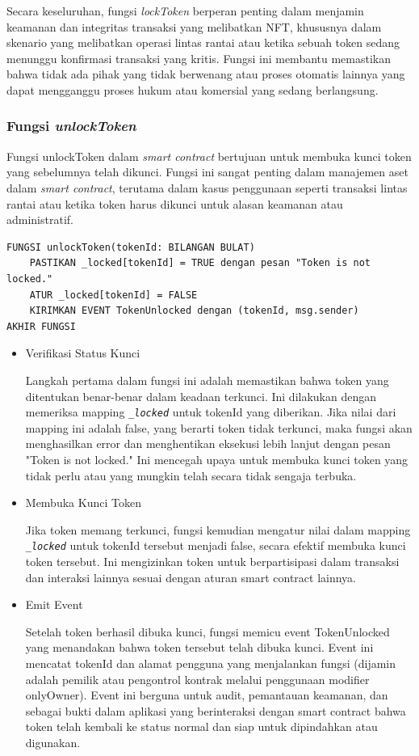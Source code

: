 Secara keseluruhan, fungsi \emph{lockToken} berperan penting dalam menjamin keamanan dan integritas transaksi yang melibatkan NFT, khususnya dalam skenario yang melibatkan operasi lintas rantai atau ketika sebuah token sedang menunggu konfirmasi transaksi yang kritis. Fungsi ini membantu memastikan bahwa tidak ada pihak yang tidak berwenang atau proses otomatis lainnya yang dapat mengganggu proses hukum atau komersial yang sedang berlangsung.

\subsubsection{Fungsi \emph{unlockToken}}
Fungsi unlockToken dalam \emph{smart contract} bertujuan untuk membuka kunci token yang sebelumnya telah dikunci. Fungsi ini sangat penting dalam manajemen aset dalam \emph{smart contract}, terutama dalam kasus penggunaan seperti transaksi lintas rantai atau ketika token harus dikunci untuk alasan keamanan atau administratif.

\begin{lstlisting}[caption=Fungsi unlockToken]
FUNGSI unlockToken(tokenId: BILANGAN BULAT)
    PASTIKAN _locked[tokenId] = TRUE dengan pesan "Token is not locked."
    ATUR _locked[tokenId] = FALSE
    KIRIMKAN EVENT TokenUnlocked dengan (tokenId, msg.sender)
AKHIR FUNGSI
\end{lstlisting}

\begin{itemize}
    \item Verifikasi Status Kunci
    
    Langkah pertama dalam fungsi ini adalah memastikan bahwa token yang ditentukan benar-benar dalam keadaan terkunci. Ini dilakukan dengan memeriksa mapping \emph{\texttt{\_locked}} untuk tokenId yang diberikan. Jika nilai dari mapping ini adalah false, yang berarti token tidak terkunci, maka fungsi akan menghasilkan error dan menghentikan eksekusi lebih lanjut dengan pesan "Token is not locked." Ini mencegah upaya untuk membuka kunci token yang tidak perlu atau yang mungkin telah secara tidak sengaja terbuka.

    \item Membuka Kunci Token
    
    Jika token memang terkunci, fungsi kemudian mengatur nilai dalam mapping \emph{\texttt{\_locked}} untuk tokenId tersebut menjadi false, secara efektif membuka kunci token tersebut. Ini mengizinkan token untuk berpartisipasi dalam transaksi dan interaksi lainnya sesuai dengan aturan smart contract lainnya.

    \item Emit Event
    
    Setelah token berhasil dibuka kunci, fungsi memicu event TokenUnlocked yang menandakan bahwa token tersebut telah dibuka kunci. Event ini mencatat tokenId dan alamat pengguna yang menjalankan fungsi (dijamin adalah pemilik atau pengontrol kontrak melalui penggunaan modifier onlyOwner). Event ini berguna untuk audit, pemantauan keamanan, dan sebagai bukti dalam aplikasi yang berinteraksi dengan smart contract bahwa token telah kembali ke status normal dan siap untuk dipindahkan atau digunakan.
\end{itemize}


